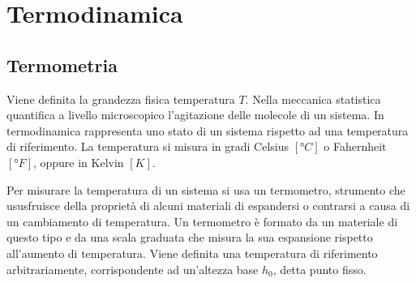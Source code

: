 \documentclass{article}
\numberwithin{equation}{subsection}
\begin{document}
\begin{center}\end{center}






\clearpage

\section{Termodinamica}

\subsection{Termometria}
Viene definita la grandezza fisica temperatura $T$. Nella 
meccanica statistica 
quantifica a livello microscopico l'agitazione delle molecole 
di un sistema. In termodinamica rappresenta uno stato di un  
sistema rispetto ad una temperatura di riferimento. La 
temperatura si misura in gradi Celsius $\left[\mbox{°}C\right]$ o 
Fahernheit $\left[\mbox{°}F\right]$, oppure in Kelvin $\left[K\right]$. 



Per misurare la temperatura di un sistema si usa un termometro, 
strumento che ususfruisce della proprietà di alcuni materiali di 
espandersi o contrarsi a causa di un cambiamento di temperatura.  
Un termometro è formato da un materiale di questo tipo e da una scala graduata che misura la sua 
espansione rispetto all'aumento di temperatura. Viene definita 
una temperatura di riferimento arbitrariamente, corrispondente 
ad un'altezza base $h_0$, detta punto fisso.
\end{document}
